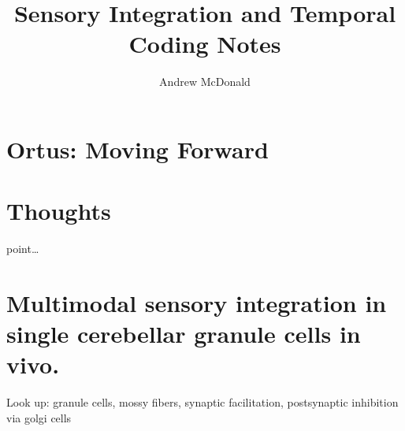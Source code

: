 \documentclass[11pt, a4paper, oneside]{article}   	%
\title{Sensory Integration and Temporal Coding Notes}
\author{Andrew McDonald}
\begin{document}
\maketitle
\hypersetup{linkcolor=blue}
\tableofcontents
\hypersetup{linkcolor=blue}
\listoffigures
\hypersetup{linkcolor=blue} %

\section{Ortus: Moving Forward}

\section{Thoughts}

\begin{outline}
    \point point\ldots
    
\end{outline}








\section{Multimodal sensory integration in single cerebellar granule cells in vivo. \cite{Ishikawa2015}}

Look up: granule cells, mossy fibers, synaptic facilitation, postsynaptic inhibition via golgi cells
\end{document}
